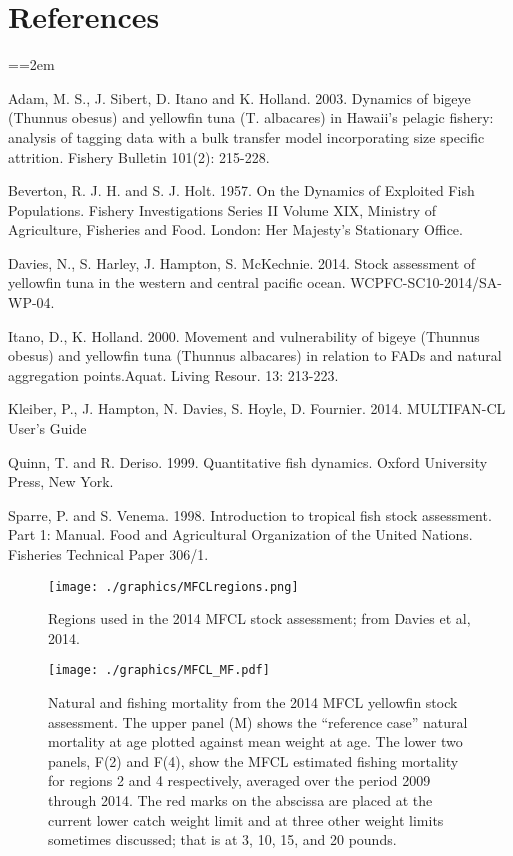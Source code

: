 \documentclass[12pt,letterpaper]{article}
\begin{document}
\section*{References}
{\parindent=0cm \small
\everypar={\hangindent=2em }\par
Adam, M. S., J. Sibert, D. Itano and K. Holland. 2003. Dynamics of
bigeye (Thunnus obesus) and yellowfin tuna (T. albacares) in Hawaii's
pelagic fishery: analysis of tagging data with a bulk transfer model
incorporating size specific attrition. Fishery Bulletin 101(2):
215-228.

Beverton, R. J. H. and S. J. Holt. 1957. On the Dynamics of Exploited
Fish Populations. Fishery Investigations Series II Volume XIX,
Ministry of Agriculture, Fisheries and Food. London: Her Majesty's
Stationary Office.

Davies, N., S. Harley, J. Hampton, S. McKechnie. 2014. Stock
assessment of yellowfin tuna in the western and central pacific ocean.
WCPFC-SC10-2014/SA-WP-04.

Itano, D., K. Holland. 2000.  Movement and vulnerability of bigeye
(Thunnus obesus) and yellowfin tuna (Thunnus albacares) in relation to
FADs and natural aggregation points.Aquat. Living Resour. 13: 213-223.

Kleiber, P., J. Hampton, N. Davies, S. Hoyle, D. Fournier. 2014.
MULTIFAN-CL User’s Guide

Quinn, T. and R. Deriso. 1999. Quantitative fish dynamics. Oxford
University Press, New York.

Sparre, P. and S. Venema. 1998. Introduction to tropical fish stock
assessment. Part 1: Manual. Food and Agricultural Organization of the
United Nations. Fisheries Technical Paper 306/1.
\par}

\begin{figure}
\begin{center}
\texttt{[image: ./graphics/MFCLregions.png]}
\caption{\label{fig:mfclreg}
Regions used in the 2014 MFCL stock assessment; from Davies et al,
2014.
}
\end{center}
\end{figure}

\begin{figure}
\begin{center}
\texttt{[image: ./graphics/MFCL\_MF.pdf]}
\caption{\label{fig:mfclmf}
Natural and fishing mortality from the 2014 MFCL yellowfin stock
assessment. The upper panel (M) shows the ``reference case'' natural
mortality at age plotted against mean weight at age.
The lower two panels, F(2) and F(4), show the MFCL estimated fishing
mortality for regions 2 and 4 respectively, averaged over the period
2009 through 2014.
The red marks on the abscissa are placed at
the current lower catch weight limit and at three other
weight limits sometimes discussed; 
that is at 3, 10, 15, and 20 pounds.
}
\end{center}
\end{figure}
\end{document}
